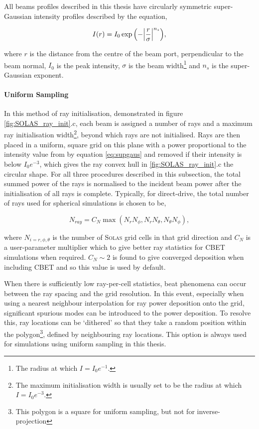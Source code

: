 All beams profiles described in this thesis have circularly symmetric super-Gaussian intensity profiles described by the equation,

\begin{equation}
    \label{eq:supgaus}
    I(r) = I_0 \exp{\Bigl( -\Bigl| \frac{r}{\sigma} \Bigr| ^{n_s} \Bigr)},
\end{equation}

where $r$ is the distance from the centre of the beam port, perpendicular to the beam normal, $I_0$ is the peak intensity, $\sigma$ is the beam width\footnote{The radius at which $I=I_0e^{-1}$.} and $n_s$ is the super-Gaussian exponent.

\paragraph*{Uniform Sampling}
In this method of ray initialisation, demonstrated in figure \ref{fig:SOLAS_ray_init}.c, each beam is assigned a number of rays and a maximum ray initialisation width\footnote{The maximum initialisation width is usually set to be the radius at which $I=I_0e^{-3}$.}, beyond which rays are not initialised.
Rays are then placed in a uniform, square grid on this plane with a power proportional to the intensity value from by equation \ref{eq:supgaus} and removed if their intensity is below $I_0e^{-3}$, which gives the ray convex hull in \ref{fig:SOLAS_ray_init}.c the circular shape.
For all three procedures described in this subsection, the total summed power of the rays is normalised to the incident beam power after the initialisation of all rays is complete.
Typically, for direct-drive, the total number of rays used for spherical simulations is chosen to be,

\begin{equation}
    \label{eq:SOLAS_nray_uniform}
    N_{ray} = C_{N}\max{(N_r N_{\phi},N_r N_{\theta},N_{\theta} N_{\phi})},
\end{equation}

where $N_{i=r,\phi,\theta}$ is the number of \textsc{Solas} grid cells in that grid direction and $C_N$ is a user-parameter multiplier which to give better ray statistics for CBET simulations when required.
$C_N\sim 2$ is found to give converged deposition when including \ac{CBET} and so this value is used by default.

When there is sufficiently low ray-per-cell statistics, beat phenomena can occur between the ray spacing and the grid resolution.
In this event, especially when using a nearest neighbour interpolation for ray power deposition onto the grid, significant spurious modes can be introduced to the power deposition.
To resolve this, ray locations can be `dithered' so that they take a random position within the polygon\footnote{This polygon is a square for uniform sampling, but not for inverse-projection}, defined by neighbouring ray locations.
This option is always used for simulations using uniform sampling in this thesis.

